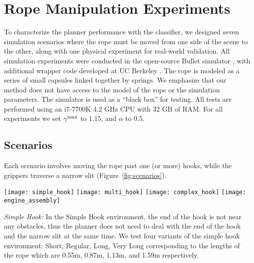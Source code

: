 \section{Rope Manipulation Experiments}

To characterize the planner performance with the classifier, we designed seven simulation scenarios where the rope must be moved from one side of the scene to the other, along with one physical experiment for real-world validation.
All simulation experiments were conducted in the open-source Bullet simulator \cite{Coumans2010}, with additional wrapper code developed at UC Berkeley \cite{ucberkley_bullet}. The rope is modeled as a series of small capsules linked together by springs. We emphasize that our method does not have access to the model of the rope or the simulation parameters. The simulator is used as a ``black box'' for testing. All tests are performed using an i7-7700K 4.2 GHz CPU with 32 GB of RAM. For all experiments we set $\gamma^{\textrm{max}}$ to $1.15$, and $\alpha$ to $0.5$.

\subsection{Scenarios}

Each scenario involves moving the rope past one (or more) hooks, while the grippers traverse a narrow slit (Figure~\ref{fig:scenarios}).

\begin{figure*}[h]
    \centering
    \texttt{[image: simple\_hook]}\hfill
    \texttt{[image: multi\_hook]}\hfill
    \texttt{[image: complex\_hook]}\hfill
    \texttt{[image: engine\_assembly]}%
    \caption{The rope is shown in green, with the grippers shown in blue. The target area for the grippers is shown in red. Walls with narrow slits for the grippers are shown in purple. Hooks and other obstacles are shown in dark cyan. Left: Simple Hook; Center Left: Multi Hook; Center Right: Complex Hook; Right: Engine Assembly}
    \label{fig:scenarios}
\end{figure*}

\textit{Simple Hook:}
In the Simple Hook environment, the end of the hook is not near any obstacles, thus the planner does not need to deal with the end of the hook and the narrow slit at the same time. We test four variants of the simple hook environment: Short, Regular, Long, Very Long corresponding to the lengths of the rope which are 0.55m, 0.87m, 1.13m, and 1.59m respectively.

